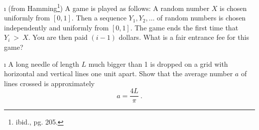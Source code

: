 {\begin{LJSItem}
\i\label{exer 6.3.28} (from Hamming\footnote{ibid., pg. 205.})  A game is
played as follows:  A random number $X$ is chosen uniformly from $[0, 1]$.  Then a sequence $Y_1,
Y_2,
\ldots$ of random numbers is chosen independently and uniformly from $[0, 1]$.  The
game ends the first time that $Y_i~>~X$.  You are then paid $(i-1)$ dollars.  What is
a fair entrance fee for this game?

\i\label{exer 6.3.29} A long needle of length $L$ much bigger than 1 is dropped on a
grid with horizontal and vertical lines one unit apart.  Show that the average number
$a$ of lines crossed is approximately
$$
a = \frac{4L}\pi\ .
$$

\end{LJSItem}}
%

